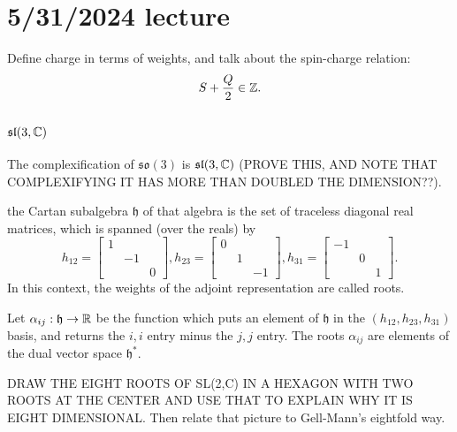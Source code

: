 \documentclass[class=article, crop=false]{standalone}
\begin{document}
\section{5/31/2024 lecture}
Define charge in terms of weights, and talk about the spin-charge relation:
\[ S + \frac{Q}{2} \in \mathbb{Z}. \]

\subsection{$\mathfrak{sl}(3,\mathbb{C})$}
The complexification of $\mathfrak{so}(3)$ is $\mathfrak{sl}(3,\mathbb{C})$ (PROVE THIS, AND NOTE THAT COMPLEXIFYING IT HAS MORE THAN DOUBLED THE DIMENSION??).
\par
the Cartan subalgebra $\mathfrak{h}$ of that algebra is the set of traceless diagonal real matrices, which is spanned (over the reals) by
\[ h_{12} = \begin{bmatrix}
    1 & & \\
      & -1 & \\
      & & 0
\end{bmatrix}, h_{23}= \begin{bmatrix}
    0 & & \\
      & 1 & \\
      & & -1
\end{bmatrix}, h_{31} = \begin{bmatrix}
    -1 & & \\
      & 0 & \\
      & & 1
\end{bmatrix}. \]
In this context, the weights of the adjoint representation are called roots.
\par
Let $\alpha_{ij} : \mathfrak{h} \rightarrow \mathbb{R}$ be the function which puts an element of $\mathfrak{h}$ in the $(h_{12}, h_{23}, h_{31})$ basis, and returns the $i,i$ entry minus the $j,j$ entry. The roots $\alpha_{ij}$ are elements of the dual vector space $\mathfrak{h}^*$.
\par
DRAW THE EIGHT ROOTS OF SL(2,C) IN A HEXAGON WITH TWO ROOTS AT THE CENTER AND USE THAT TO EXPLAIN WHY IT IS EIGHT DIMENSIONAL. Then relate that picture to Gell-Mann's eightfold way.
\end{document}
